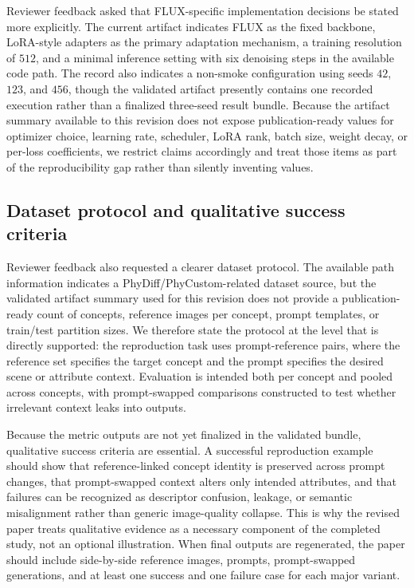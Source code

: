 \documentclass{article}
\begin{document}
Reviewer feedback asked that FLUX-specific implementation decisions be stated more explicitly. The current artifact indicates FLUX as the fixed backbone, LoRA-style adapters as the primary adaptation mechanism, a training resolution of \(512\), and a minimal inference setting with six denoising steps in the available code path. The record also indicates a non-smoke configuration using seeds \(42\), \(123\), and \(456\), though the validated artifact presently contains one recorded execution rather than a finalized three-seed result bundle. Because the artifact summary available to this revision does not expose publication-ready values for optimizer choice, learning rate, scheduler, LoRA rank, batch size, weight decay, or per-loss coefficients, we restrict claims accordingly and treat those items as part of the reproducibility gap rather than silently inventing values.

\subsection{Dataset protocol and qualitative success criteria}

Reviewer feedback also requested a clearer dataset protocol. The available path information indicates a PhyDiff/PhyCustom-related dataset source, but the validated artifact summary used for this revision does not provide a publication-ready count of concepts, reference images per concept, prompt templates, or train/test partition sizes. We therefore state the protocol at the level that is directly supported: the reproduction task uses prompt-reference pairs, where the reference set specifies the target concept and the prompt specifies the desired scene or attribute context. Evaluation is intended both per concept and pooled across concepts, with prompt-swapped comparisons constructed to test whether irrelevant context leaks into outputs.

Because the metric outputs are not yet finalized in the validated bundle, qualitative success criteria are essential. A successful reproduction example should show that reference-linked concept identity is preserved across prompt changes, that prompt-swapped context alters only intended attributes, and that failures can be recognized as descriptor confusion, leakage, or semantic misalignment rather than generic image-quality collapse. This is why the revised paper treats qualitative evidence as a necessary component of the completed study, not an optional illustration. When final outputs are regenerated, the paper should include side-by-side reference images, prompts, prompt-swapped generations, and at least one success and one failure case for each major variant.
\end{document}
